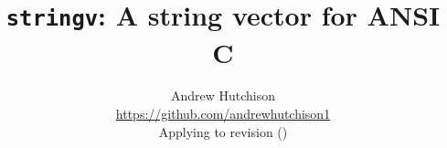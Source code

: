 \documentclass[a4paper]{article}
\title{\texttt{stringv}: A string vector for ANSI C}
\author{%
    Andrew Hutchison \\%
    \url{https://github.com/andrewhutchison1} \\%
    Applying to revision \gitAbbrevHash (\gitAuthorDate)}
\begin{document}
\maketitle

\begin{abstract}
\end{abstract}

\tableofcontents
\end{document}
